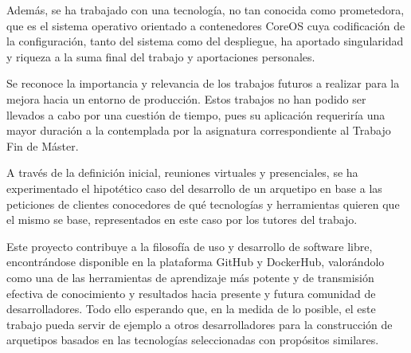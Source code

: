 Además, se ha trabajado con una tecnología, no tan conocida como prometedora, que es el sistema operativo orientado a contenedores CoreOS cuya codificación de la configuración, tanto del sistema como del despliegue, ha aportado singularidad y riqueza a la suma final del trabajo y aportaciones personales.

Se reconoce la importancia y relevancia de los trabajos futuros a realizar para la mejora hacia un entorno de producción. Estos trabajos no han podido ser llevados a cabo por una cuestión de tiempo, pues su aplicación requeriría una mayor duración a la contemplada por la asignatura correspondiente al Trabajo Fin de Máster.

A través de la definición inicial, reuniones virtuales y presenciales, se ha experimentado el hipotético caso del desarrollo de un arquetipo en base a las peticiones de clientes conocedores de qué tecnologías y herramientas quieren que el mismo se base, representados en este caso por los tutores del trabajo. 

Este proyecto contribuye a la filosofía de uso y desarrollo de software libre, encontrándose disponible en la plataforma GitHub y DockerHub, valorándolo como una de las herramientas de aprendizaje más potente y de transmisión efectiva de conocimiento y resultados hacia presente y futura comunidad de desarrolladores. Todo ello esperando que, en la medida de lo posible, el este trabajo pueda servir de ejemplo a otros desarrolladores para la construcción de arquetipos basados en las tecnologías seleccionadas con propósitos similares.

